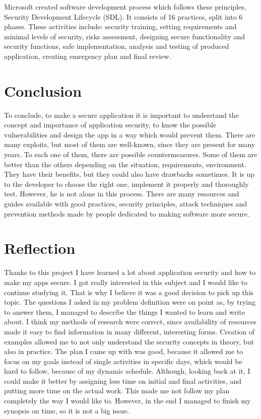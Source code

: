 \documentclass[a4paper]{article}
\begin{document}
Microsoft created software development process which follows these principles,
Security Development Lifecycle (SDL). It consists of 16 practices, split into 6
phases. These activities include: security training, setting requirements and
minimal levels of security, risks assessment, designing secure functionality and
security functions, safe implementation, analysis and testing of produced
application, creating emergency plan and final review.

\newpage

\section{Conclusion}

To conclude, to make a secure application it is important to understand the
concept and importance of application security, to know the possible
vulnerabilities and design the app in a way which would prevent them. There are
many exploits, but most of them are well-known, since they are present for many
years. To each one of them, there are possible countermeasures. Some of them are
better than the others depending on the situation, requirements, environment.
They have their benefits, but they could also have drawbacks sometimes. It is up
to the developer to choose the right one, implement it properly and thoroughly
test. However, he is not alone in this process. There are many resources and
guides available with good practices, security principles, attack techniques and
prevention methods made by people dedicated to making software more secure.

\section{Reflection}

Thanks to this project I have learned a lot about application security and how
to make my apps secure. I got really interested in this subject and I would like
to continue studying it. That is why I believe it was a good decision to pick up
this topic. The questions I asked in my problem definition were on point as, by
trying to answer them, I managed to describe the things I wanted to learn and
write about. I think my methods of research were correct, since availability of
resources made it easy to find information in many different, interesting forms.
Creation of examples allowed me to not only understand the security concepts in
theory, but also in practice. The plan I came up with was good, because it
allowed me to focus on my goals instead of single activities in specific days,
which would be hard to follow, because of my dynamic schedule. Although, looking
back at it, I could make it better by assigning less time on initial and final
activities, and putting more time on the actual work. This made me not follow my
plan completely the way I would like to. However, in the end I managed to finish
my synopsis on time, so it is not a big issue.
\end{document}
